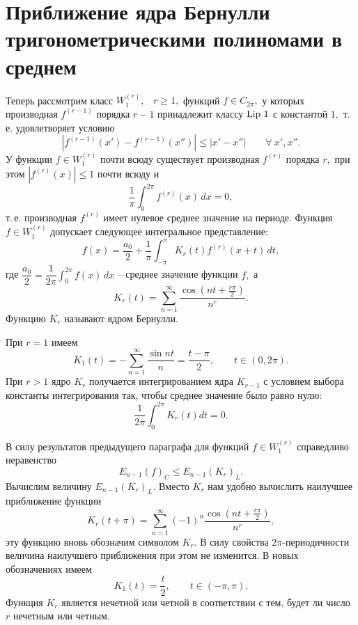  \section{Приближение ядра Бернулли\\ тригонометрическими полиномами в среднем}



 Теперь рассмотрим класс ${W_1^{(r)}},$~ $r\ge 1,$ функций $f\in C_{2\pi},$
 у которых производная $f^{(r-1)}$
 порядка $r-1$ принадлежит классу ${\rm Lip\ }1$ с константой $1,$
 т.\,е. удовлетворяет условию
 $$
 |f^{(r-1)}(x')-f^{(r-1)}(x'')|\le |x'-x''|\qquad \forall\ x',x''.
 $$
 У функции $f\in {W_1^{(r)}}$ почти всюду  существует производная  $f^{(r)}$ порядка $r,$
  при этом $|f^{(r)}(x)|\le 1$ почти всюду и
 $$\frac{1}{\pi}\int_0^{2\pi}f^{(r)}(x)\, dx=0,$$
 т.\,е. производная $f^{(r)}$
 имеет нулевое среднее значение на периоде. Функция $f\in {W_1^{(r)}}$  допускает следующее интегральное
 представление:
 \begin{equation}\label{f18-12}
 f(x)=\frac{a_0}{2}+\frac{1}{\pi}\int_{-\pi}^{\pi} K_r(t) f^{(r)}(x+t)\, dt, %
 \end{equation}
 где $\dfrac{a_0}{2}=\dfrac{1}{2\pi}\displaystyle\int_0^{2\pi}f(x)\,dx$
 -- среднее значение функции $f,$ а
 \begin{equation}\label{f18-13}
 K_r(t)=\sum\limits_{n=1}^{\infty}\frac{\cos\left( nt+\frac{r\pi}{2}\right)} {n^r}. %
 \end{equation}
 Функцию $K_r$ называют ядром Бернулли.

 При $r=1$ имеем
 $$
 K_1(t)=-\sum\limits_{n=1}^{\infty}\frac{\sin nt}{n}=\frac{t-\pi}{2},\qquad
 t\in (0,2\pi).
 $$
 При $r>1$ ядро  $K_r$  получается интегрированием ядра  $K_{r-1}$ с условием выбора константы интегрирования так, чтобы среднее значение было равно нулю:
 $$
\frac{1}{2\pi} \int_0^{2\pi} K_r(t)dt=0.
 $$




 В силу результатов предыдущего параграфа для функций $f\in {W_1^{(r)}}$ справедливо неравенство
 $$
 E_{n-1}(f)_C\le E_{n-1}(K_r)_L.
 $$
 Вычислим величину $E_{n-1}(K_r)_L.$ Вместо $K_r$ нам удобно вычислить наилучшее приближение функции
 $$
 K_r(t+\pi)=\sum\limits_{n=1}^{\infty}(-1)^n\frac{\cos\left( nt+\frac{r\pi}{2}\right)} {n^r},
 $$
 эту функцию вновь обозначим символом $K_r.$ В силу свойства $2\pi$-периодичности
 величина наилучшего приближения при этом не изменится. В новых обозначениях имеем
 $$
 K_1(t)=\frac{t}{2},\qquad t\in (-\pi,\pi).
 $$
Функция $K_r$ является нечетной или четной в соответствии с тем, будет ли число $r$ нечетным или четным.

